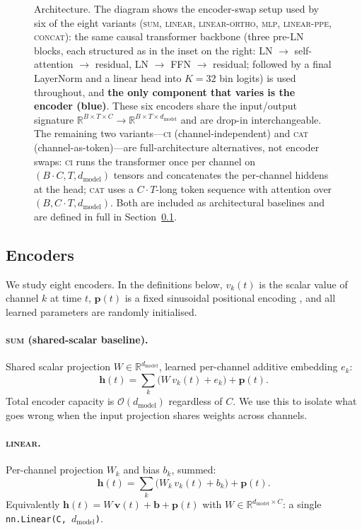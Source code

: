 \documentclass[11pt]{article}
\begin{document}
\begin{figure}[t]
\begin{tikzpicture}
\end{tikzpicture}
\caption{Architecture. The diagram shows the encoder-swap setup
used by six of the eight variants
(\textsc{sum}, \textsc{linear}, \textsc{linear-ortho}, \textsc{mlp},
\textsc{linear-ppe}, \textsc{concat}): the same causal transformer
backbone (three pre-LN blocks, each structured as in the inset on
the right: LN $\to$ self-attention $\to$ residual, LN $\to$ FFN
$\to$ residual; followed by a final LayerNorm and a linear head
into $K{=}32$ bin logits) is used throughout, and \textbf{the only
component that varies is the encoder (blue)}. These six encoders
share the input/output signature $\mathbb{R}^{B\times T\times C}
\to \mathbb{R}^{B\times T\times d_{\text{model}}}$ and are drop-in
interchangeable. The remaining two variants---\textsc{ci}
(channel-independent) and \textsc{cat} (channel-as-token)---are
full-architecture alternatives, not encoder swaps: \textsc{ci}
runs the transformer once per channel on $(B{\cdot}C, T,
d_{\text{model}})$ tensors and concatenates the per-channel
hiddens at the head; \textsc{cat} uses a $C{\cdot}T$-long token
sequence with attention over $(B, C{\cdot}T, d_{\text{model}})$.
Both are included as architectural baselines and are defined in
full in Section~\ref{sec:method-encoders}.}
\label{fig:arch}
\end{figure}

\subsection{Encoders}
\label{sec:method-encoders}

We study eight encoders. In the definitions below, $v_k(t)$ is the
scalar value of channel $k$ at time $t$, $\mathbf{p}(t)$ is a fixed
sinusoidal positional encoding \citep{vaswani2017attention}, and all
learned parameters are randomly initialised.

\paragraph{\textsc{sum} (shared-scalar baseline).} Shared scalar projection
$W \in \mathbb{R}^{d_{\text{model}}}$, learned per-channel additive
embedding $e_k$:
\[
  \mathbf{h}(t) = \sum_k \bigl(W\,v_k(t) + e_k\bigr) + \mathbf{p}(t).
\]
Total encoder capacity is $\mathcal{O}(d_{\text{model}})$ regardless of
$C$. We use this to isolate what goes wrong when the input projection
shares weights across channels.

\paragraph{\textsc{linear}.} Per-channel projection $W_k$ and bias $b_k$,
summed:
\[
  \mathbf{h}(t) = \sum_k \bigl(W_k\,v_k(t) + b_k\bigr) + \mathbf{p}(t).
\]
Equivalently $\mathbf{h}(t) = W\,\mathbf{v}(t) + \mathbf{b} +
\mathbf{p}(t)$ with $W \in \mathbb{R}^{d_{\text{model}}\times C}$:
a single \texttt{nn.Linear(C, $d_{\text{model}}$)}.
\end{document}
